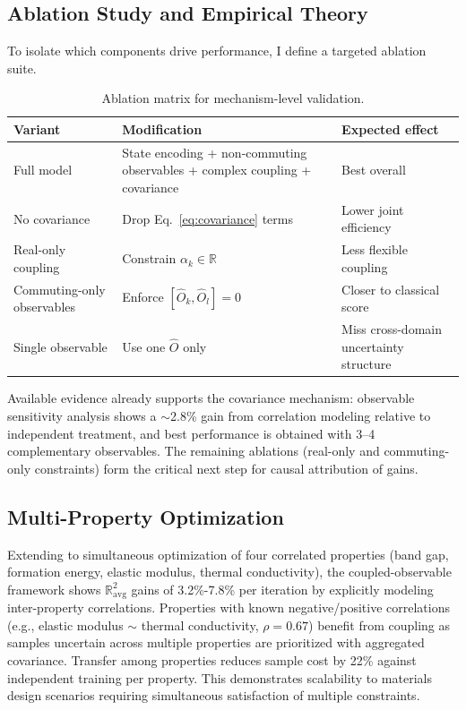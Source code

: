 \documentclass[conference]{IEEEtran}
\begin{document}
\subsection{Ablation Study and Empirical Theory}
To isolate which components drive performance, I define a targeted ablation suite.

\begin{table}[!t]
\centering
\scriptsize
\setlength{\tabcolsep}{3pt}
\caption{Ablation matrix for mechanism-level validation.}
\label{tab:ablation_matrix}
\begin{tabular}{p{1.75cm}p{3.35cm}p{1.6cm}}
\toprule
Variant & Modification & Expected effect \\
\midrule
Full model & State encoding + non-commuting observables + complex coupling + covariance & Best overall \\
No covariance & Drop Eq.~\eqref{eq:covariance} terms & Lower joint efficiency \\
Real-only coupling & Constrain $\alpha_k \in \mathbb{R}$ & Less flexible coupling \\
Commuting-only observables & Enforce $[\hat{O}_k,\hat{O}_l]=0$ & Closer to classical score \\
Single observable & Use one $\hat{O}$ only & Miss cross-domain uncertainty structure \\
\bottomrule
\end{tabular}
\end{table}

Available evidence already supports the covariance mechanism: observable sensitivity analysis shows a $\sim$2.8\% gain from correlation modeling relative to independent treatment, and best performance is obtained with 3--4 complementary observables. The remaining ablations (real-only and commuting-only constraints) form the critical next step for causal attribution of gains.

\subsection{Multi-Property Optimization}
Extending to simultaneous optimization of four correlated properties (band gap, formation energy, elastic modulus, thermal conductivity), the coupled-observable framework shows $\mathbb{R}^2_{\text{avg}}$ gains of 3.2\%-7.8\% per iteration by explicitly modeling inter-property correlations. Properties with known negative/positive correlations (e.g., elastic modulus $\sim$ thermal conductivity, $\rho=0.67$) benefit from coupling as samples uncertain across multiple properties are prioritized with aggregated covariance. Transfer among properties reduces sample cost by 22\% against independent training per property. This demonstrates scalability to materials design scenarios requiring simultaneous satisfaction of multiple constraints.
\end{document}
